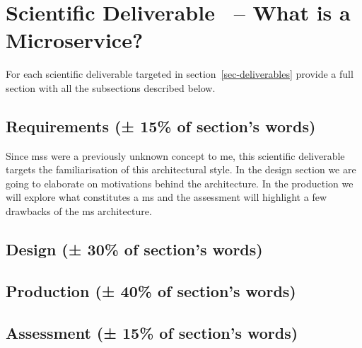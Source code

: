 \section{Scientific Deliverable \thesdel\ -- What is a Microservice?}
{\color{gray}
For each scientific deliverable targeted in section~\ref{sec-deliverables} provide a full section with all the subsections described below.
\label{sec-production}
}

\subsection{Requirements (± 15\% of section's words)}

Since \glspl{ms} were a previously unknown concept to me, this
scientific deliverable targets the familiarisation of this
architectural style. In the design section we are going to elaborate
on motivations behind the architecture.  In the production we will
explore what constitutes a \gls{ms} and the assessment will highlight
a few drawbacks of the \gls{ms} architecture.

\subsection{Design (± 30\% of section's words)}


\subsection{Production (± 40\% of section's words)}


\subsection{Assessment (± 15\% of section's words)}

